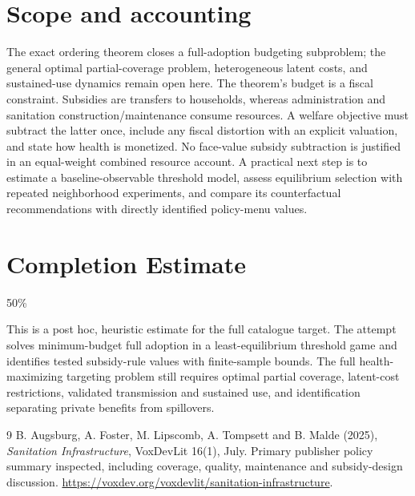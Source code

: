\documentclass[11pt]{article}
\begin{document}
\section{Scope and accounting}
The exact ordering theorem closes a full-adoption budgeting subproblem;
the general optimal partial-coverage problem, heterogeneous latent costs,
and sustained-use dynamics remain open here. The theorem's budget is a
fiscal constraint. Subsidies are transfers to households, whereas
administration and sanitation construction/maintenance consume resources.
A welfare objective must subtract the latter once, include any fiscal
distortion with an explicit valuation, and state how health is monetized.
No face-value subsidy subtraction is justified in an equal-weight combined
resource account. A practical next step is to estimate a baseline-observable
threshold model, assess equilibrium selection with repeated neighborhood
experiments, and compare its counterfactual recommendations with directly
identified policy-menu values.

\section{Completion Estimate}
50\%

This is a post hoc, heuristic estimate for the full catalogue target.
The attempt solves minimum-budget full adoption in a least-equilibrium threshold game and identifies tested subsidy-rule values with finite-sample bounds. The full health-maximizing targeting problem still requires optimal partial coverage, latent-cost restrictions, validated transmission and sustained use, and identification separating private benefits from spillovers.

\begin{thebibliography}{9}
 B. Augsburg, A. Foster, M. Lipscomb, A. Tompsett and B. Malde
(2025), \emph{Sanitation Infrastructure}, VoxDevLit 16(1), July.
Primary publisher policy summary inspected, including coverage, quality,
maintenance and subsidy-design discussion.
\url{https://voxdev.org/voxdevlit/sanitation-infrastructure}.
\end{thebibliography}
\end{document}

